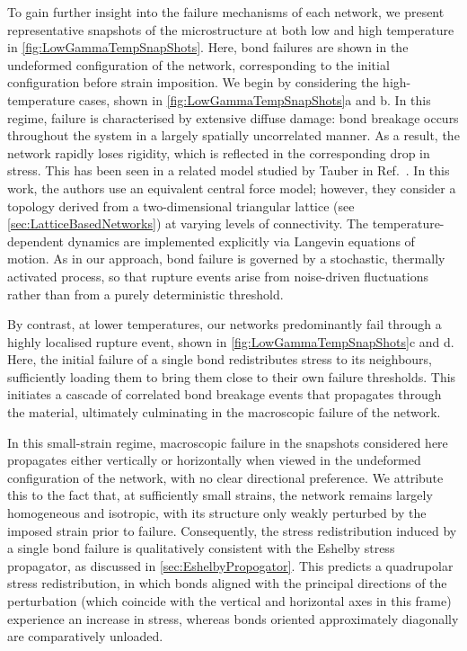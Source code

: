 To gain further insight into the failure mechanisms of each network, we present representative snapshots of the microstructure at both low and high temperature in \cref{fig:LowGammaTempSnapShots}. Here, bond failures are shown in the undeformed configuration of the network, corresponding to the initial configuration before strain imposition. We begin by considering the high-temperature cases, shown in \cref{fig:LowGammaTempSnapShots}a and b. In this regime, failure is characterised by extensive diffuse damage: bond breakage occurs throughout the system in a largely spatially uncorrelated manner. As a result, the network rapidly loses rigidity, which is reflected in the corresponding drop in stress. This has been seen in a related model studied by Tauber \etal in Ref.~\cite{tauber_role_2020}. In this work, the authors use an equivalent central force model; however, they consider a topology derived from a two-dimensional triangular lattice (see \cref{sec:LatticeBasedNetworks}) at varying levels of connectivity. The temperature-dependent dynamics are implemented explicitly via Langevin equations of motion. As in our approach, bond failure is governed by a stochastic, thermally activated process, so that rupture events arise from noise-driven fluctuations rather than from a purely deterministic threshold. 

By contrast, at lower temperatures, our networks predominantly fail through a highly localised rupture event, shown in \cref{fig:LowGammaTempSnapShots}c and d. Here, the initial failure of a single bond redistributes stress to its neighbours, sufficiently loading them to bring them close to their own failure thresholds. This initiates a cascade of correlated bond breakage events that propagates through the material, ultimately culminating in the macroscopic failure of the network.

In this small-strain regime, macroscopic failure in the snapshots considered here propagates either vertically or horizontally when viewed in the undeformed configuration of the network, with no clear directional preference. We attribute this to the fact that, at sufficiently small strains, the network remains largely homogeneous and isotropic, with its structure only weakly perturbed by the imposed strain prior to failure. Consequently, the stress redistribution induced by a single bond failure is qualitatively consistent with the Eshelby stress propagator, as discussed in \cref{sec:EshelbyPropogator}. This predicts a quadrupolar stress redistribution, in which bonds aligned with the principal directions of the perturbation (which coincide with the vertical and horizontal axes in this frame) experience an increase in stress, whereas bonds oriented approximately diagonally are comparatively unloaded.

